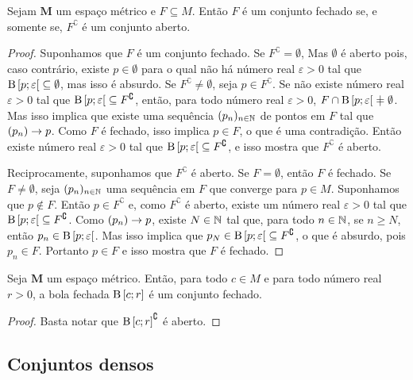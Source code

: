 \begin{proposition}
Sejam $\bm M$ um espaço métrico e $F \subseteq M$. Então $F$ é um conjunto fechado se, e somente se, $F^\complement$ é um conjunto aberto.
\end{proposition}
\begin{proof}
Suponhamos que $F$ é um conjunto fechado. Se $F^\complement = \emptyset$, Mas $\emptyset$ é aberto pois, caso contrário, existe $p \in \emptyset$ para o qual não há número real $\varepsilon > 0$ tal que $\mathrm{B}\left[{p};{\varepsilon}\right[ \subseteq \emptyset$, mas isso é absurdo. Se $F^\complement \neq \emptyset$, seja $p \in F^\complement$. Se não existe número real $\varepsilon > 0$ tal que $\mathrm{B}\left[{p};{\varepsilon}\right[ \subseteq F^\complement$, então, para todo número real $\varepsilon > 0$, $F \cap \bola{p}{\varepsilon} \neq \emptyset$. Mas isso implica que existe uma sequência $(p_n)_{n \in \mathbb{N}}$ de pontos em $F$ tal que $(p_n) \rightarrow p$. Como $F$ é fechado, isso implica $p \in F$, o que é uma contradição. Então existe número real $\varepsilon > 0$ tal que $\mathrm{B}\left[{p};{\varepsilon}\right[ \subseteq F^\complement$, e isso mostra que $F^\complement$ é aberto.
	
Reciprocamente, suponhamos que $F^\complement$ é aberto. Se $F = \emptyset$, então $F$ é fechado. Se $F \neq \emptyset$, seja $(p_n)_{n \in \mathbb{N}}$ uma sequência em $F$ que converge para $p \in M$. Suponhamos que $p \notin F$. Então $p \in F^\complement$ e, como $F^\complement$ é aberto, existe um número real $\varepsilon > 0$ tal que $\mathrm{B}\left[{p};{\varepsilon}\right[ \subseteq F^\complement$. Como $(p_n) \rightarrow p$, existe $N \in \mathbb{N}$ tal que, para todo $n \in \mathbb{N}$, se $n \geq N$, então $p_n \in \mathrm{B}\left[{p};{\varepsilon}\right[$. Mas isso implica que $p_N \in \mathrm{B}\left[{p};{\varepsilon}\right[ \subseteq F^\complement$, o que é absurdo, pois $p_n \in F$. Portanto $p \in F$ e isso mostra que $F$ é fechado.
\end{proof}

\begin{proposition}
Seja $\bm M$ um espaço métrico. Então, para todo $c \in M$ e para todo número real $r > 0$, a bola fechada $\mathrm{B}\left[{c};{r}\right]$ é um conjunto fechado.
\end{proposition}
\begin{proof}
Basta notar que $\mathrm{B}\left[{c};{r}\right]^\complement$ é aberto.
\end{proof}

\subsection{Conjuntos densos}

